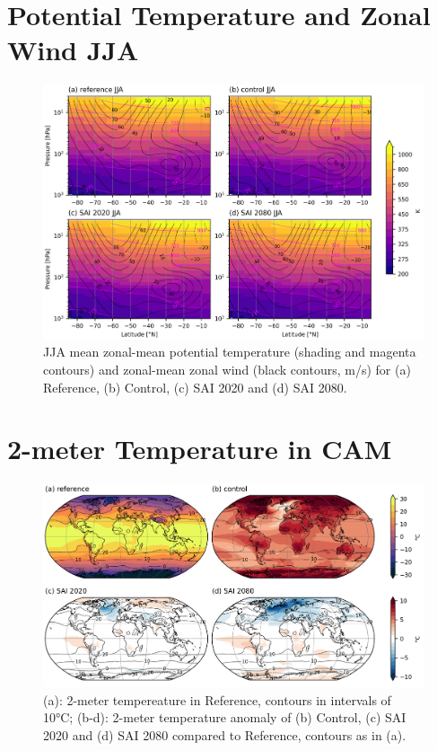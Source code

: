 \section{Potential Temperature and Zonal Wind JJA}\label{app_th_U_JJA}

\begin{figure}[H]
	\centering
	\includegraphics[width=0.95\linewidth]{images/th_U_zm_JJA.png}
	\caption{JJA mean zonal-mean potential temperature (shading and magenta contours) and zonal-mean zonal wind (black contours, m/s) for (a) Reference, (b) Control, (c) SAI 2020 and (d) SAI 2080.}
	\label{fig:th_U_zm_JJA}
\end{figure}

\section{2-meter Temperature in CAM}\label{app_trefht}
\begin{figure}[H]
	\centering
	\includegraphics[width=0.95\linewidth]{images/TREFHT_scens_ann.png}
	\caption{(a): 2-meter tempereature in Reference, contours in intervals of 10°C; (b-d): 2-meter temperature anomaly of (b) Control, (c) SAI 2020 and (d) SAI 2080 compared to Reference, contours as in (a).}
	\label{fig:TREFHT_scens_ann}
\end{figure}


